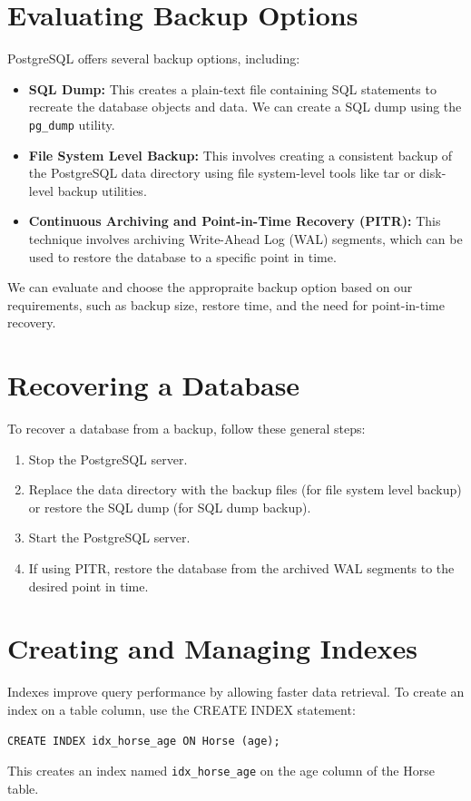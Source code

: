 \documentclass{article}
\def\c#1{\texttt{#1}}
\begin{document}
\section{Evaluating Backup Options} %
\label{sec:Evaluating Backup Options}
PostgreSQL offers several backup options, including:

\begin{itemize}
	\item \textbf{SQL Dump:} This creates a plain-text file containing SQL statements to recreate the database objects and data. We can create a SQL dump using the \c{pg\_dump} utility.
	\item \textbf{File System Level Backup:} This involves creating a consistent backup of the PostgreSQL data directory using file system-level tools like tar or disk-level backup utilities.
	\item \textbf{Continuous Archiving and Point-in-Time Recovery (PITR):} This technique involves archiving Write-Ahead Log (WAL) segments, which can be used to restore the database to a specific point in time.
\end{itemize}
We can evaluate and choose the appropraite backup option based on our requirements, such as backup size, restore time, and the need for point-in-time recovery.

\section{Recovering a Database} %
\label{sec:Recovering a Database}
To recover a database from a backup, follow these general steps:
\begin{enumerate}
	\item Stop the PostgreSQL server.
	\item Replace the data directory with the backup files (for file system level backup) or restore the SQL dump (for SQL dump backup).
	\item Start the PostgreSQL server.
	\item If using PITR, restore the database from the archived WAL segments to the desired point in time.
\end{enumerate}

\section{Creating and Managing Indexes} %
\label{sec:Creating and Managing Indexes}
Indexes improve query performance by allowing faster data retrieval. To create an index on a table column, use the CREATE INDEX statement:
\begin{lstlisting}
CREATE INDEX idx_horse_age ON Horse (age);
\end{lstlisting}
This creates an index named \c{idx\_horse\_age} on the age column of the Horse table.
\end{document}

